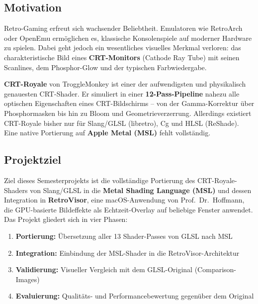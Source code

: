\documentclass[11pt, a4paper]{article}
\begin{document}
\subsection{Motivation}
\vspace{.5cm}
Retro-Gaming erfreut sich wachsender Beliebtheit. Emulatoren wie RetroArch oder OpenEmu erm\"oglichen es, klassische Konsolenspiele auf moderner Hardware zu spielen. Dabei geht jedoch ein wesentliches visuelles Merkmal verloren: das charakteristische Bild eines \textbf{CRT-Monitors} (Cathode Ray Tube) mit seinen Scanlines, dem Phosphor-Glow und der typischen \newline Farbwiedergabe. \vspace{.5cm}

\textbf{CRT-Royale} von TroggleMonkey ist einer der aufwendigsten und physikalisch genauesten CRT-Shader. Er simuliert in einer \textbf{12-Pass-Pipeline} nahezu alle optischen Eigenschaften eines CRT-Bildschirms -- von der Gamma-Korrektur \"uber Phosphormasken bis hin zu Bloom und \newline Geometrieverzerrung. Allerdings existiert CRT-Royale bisher nur f\"ur Slang/GLSL (libretro), \newline Cg und HLSL (ReShade). Eine native Portierung auf \textbf{Apple Metal (MSL)} fehlt vollst\"andig.

\vspace{.5cm}
\subsection{Projektziel}
\vspace{.5cm}
Ziel dieses Semesterprojekts ist die vollst\"andige Portierung des CRT-Royale-Shaders von Slang/GLSL in die \textbf{Metal Shading Language (MSL)} und dessen Integration in \textbf{RetroVisor}, eine macOS-Anwendung von Prof.~Dr.~Hoffmann, die GPU-basierte Bildeffekte als Echtzeit-Overlay auf \newline beliebige Fenster anwendet.
\vspace{.5cm} \newline
Das Projekt gliedert sich in vier Phasen: \vspace{.25cm}
\begin{enumerate}[nosep]
    \item \textbf{Portierung:} \"Ubersetzung aller 13 Shader-Passes von GLSL nach MSL \\
    \item \textbf{Integration:} Einbindung der MSL-Shader in die RetroVisor-Architektur \\
    \item \textbf{Validierung:} Visueller Vergleich mit dem GLSL-Original (Comparison-Images) \\
    \item \textbf{Evaluierung:} Qualit\"ats- und Performancebewertung gegen\"uber dem Original
\end{enumerate}
\end{document}
